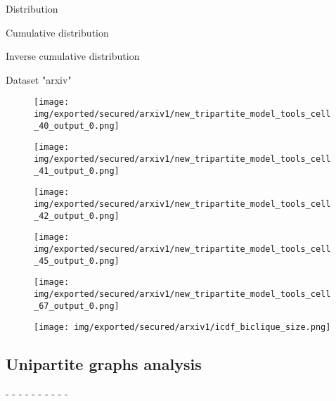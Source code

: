 \documentclass[table]{report}
\begin{document}
Distribution

Cumulative distribution


Inverse cumulative distribution


Dataset "arxiv"

\begin{figure}[h]%
\centering
\texttt{[image: img/exported/secured/arxiv1/new\_tripartite\_model\_tools\_cell\_40\_output\_0.png]}
\caption{}
\label{fig:graphs}
\end{figure}
\FloatBarrier

\begin{figure}[h]%
\centering
\texttt{[image: img/exported/secured/arxiv1/new\_tripartite\_model\_tools\_cell\_41\_output\_0.png]}
\caption{}
\label{fig:graphs}
\end{figure}
\FloatBarrier

\begin{figure}[h]%
\centering
\texttt{[image: img/exported/secured/arxiv1/new\_tripartite\_model\_tools\_cell\_42\_output\_0.png]}
\caption{}
\label{fig:graphs}
\end{figure}
\FloatBarrier

\begin{figure}[h]%
\centering
\texttt{[image: img/exported/secured/arxiv1/new\_tripartite\_model\_tools\_cell\_45\_output\_0.png]}
\caption{}
\label{fig:graphs}
\end{figure}
\FloatBarrier


\begin{figure}[h]%
\centering
\texttt{[image: img/exported/secured/arxiv1/new\_tripartite\_model\_tools\_cell\_67\_output\_0.png]}
\caption{}
\label{fig:graphs}
\end{figure}
\FloatBarrier


\begin{figure}[h]%
\centering
\texttt{[image: img/exported/secured/arxiv1/icdf\_biclique\_size.png]}
\caption{}
\label{fig:graphs}
\end{figure}
\FloatBarrier


\subsection{Unipartite graphs analysis}

- - - - - - - - - -
 
\end{document}
